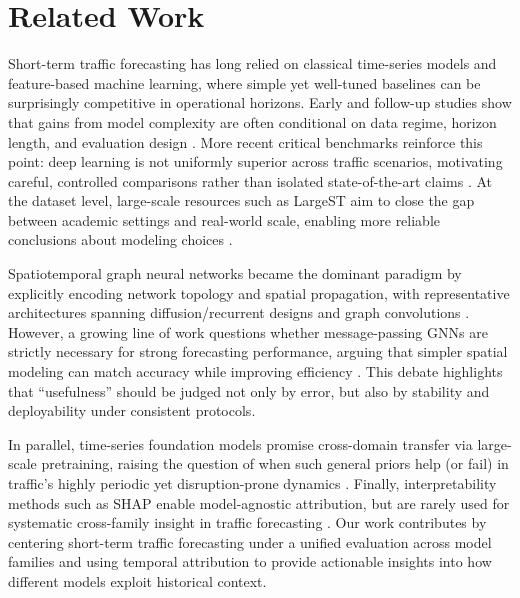 \documentclass[10pt]{article}
\begin{document}


\section{Related Work}
\label{sec:related}

Short-term traffic forecasting has long relied on classical time-series models and feature-based machine learning, where simple yet well-tuned baselines can be surprisingly competitive in operational horizons. Early and follow-up studies show that gains from model complexity are often conditional on data regime, horizon length, and evaluation design \citep{smith2002comparison, karlaftis2011statistical}. More recent critical benchmarks reinforce this point: deep learning is not uniformly superior across traffic scenarios, motivating careful, controlled comparisons rather than isolated state-of-the-art claims \citep{manibardo2021deep}. At the dataset level, large-scale resources such as LargeST aim to close the gap between academic settings and real-world scale, enabling more reliable conclusions about modeling choices \citep{liu2023largest}.

Spatiotemporal graph neural networks  became the dominant paradigm by explicitly encoding network topology and spatial propagation, with representative architectures spanning diffusion/recurrent designs and graph convolutions \citep{yu2018stgcn, wu2019graphwavenet}. However, a growing line of work questions whether message-passing GNNs are strictly necessary for strong forecasting performance, arguing that simpler spatial modeling can match accuracy while improving efficiency \citep{liu2023needgnn}. This debate highlights that “usefulness” should be judged not only by error, but also by stability and deployability under consistent protocols.

In parallel, time-series foundation models promise cross-domain transfer via large-scale pretraining, raising the question of when such general priors help (or fail) in traffic’s highly periodic yet disruption-prone dynamics \citep{ansari2024chronos, das2024timesfm, woo2024moirai}. Finally, interpretability methods such as SHAP enable model-agnostic attribution, but are rarely used for systematic cross-family insight in traffic forecasting \citep{lundberg2017shap}. Our work contributes by centering short-term traffic forecasting under a unified evaluation across model families and using temporal attribution to provide actionable insights into how different models exploit historical context.
\end{document}
